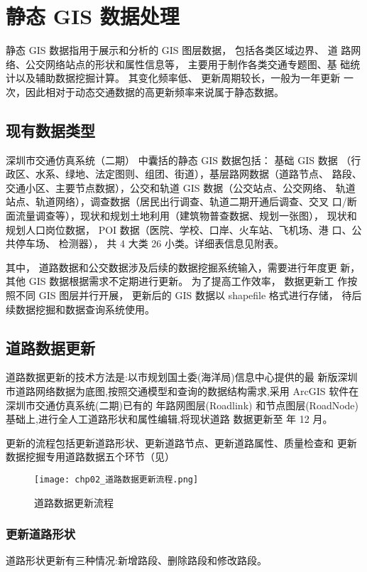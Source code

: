 \section{静态 GIS 数据处理} \label{sec:静态GIS数据处理}
静态 GIS 数据指用于展示和分析的 GIS 图层数据， 包括各类区域边界、 道
路网络、公交网络站点的形状和属性信息等， 主要用于制作各类交通专题图、基
础统计以及辅助数据挖掘计算。 其变化频率低、 更新周期较长，一般为一年更新
一次，因此相对于动态交通数据的高更新频率来说属于静态数据。

\subsection{现有数据类型} \label{sec:现有数据类型}
深圳市交通仿真系统（二期） 中囊括的静态 GIS 数据包括： 基础 GIS 数据
（行政区、水系、绿地、法定图则、组团、街道），基层路网数据（道路节点、
路段、交通小区、主要节点数据），公交和轨道 GIS 数据（公交站点、公交网络、
轨道站点、轨道网络），调查数据（居民出行调查、轨道二期开通后调查、交叉
口/断面流量调查等），现状和规划土地利用（建筑物普查数据、规划一张图），
现状和规划人口岗位数据， POI 数据（医院、学校、口岸、火车站、飞机场、港
口、公共停车场、 检测器）， 共 4 大类 26 小类。详细表信息见附表。

其中， 道路数据和公交数据涉及后续的数据挖掘系统输入，需要进行年度更
新，其他 GIS 数据根据需求不定期进行更新。 为了提高工作效率， 数据更新工
作按照不同 GIS 图层并行开展， 更新后的 GIS 数据以 shapefile 格式进行存储，
待后续数据挖掘和数据查询系统使用。

\subsection{道路数据更新}
道路数据更新的技术方法是:以市规划国土委(海洋局)信息中心提供的最
新版深圳市道路网络数据为底图,按照交通模型和查询的数据结构需求,采用
ArcGIS 软件在深圳市交通仿真系统(二期)已有的 \ppyear 年路网图层(Roadlink)
和节点图层(RoadNode)基础上,进行全人工道路形状和属性编辑,将现状道路
数据更新至 \pyear 年 12 月。

更新的流程包括更新道路形状、更新道路节点、更新道路属性、质量检查和
更新数据挖掘专用道路数据五个环节（见）

\begin{figure}[ht]
  \centering
  \texttt{[image: chp02\_道路数据更新流程.png]}
  \caption{道路数据更新流程\label{fig:道路数据更新流程} }
\end{figure}

\subsubsection{更新道路形状}
道路形状更新有三种情况:新增路段、删除路段和修改路段。

